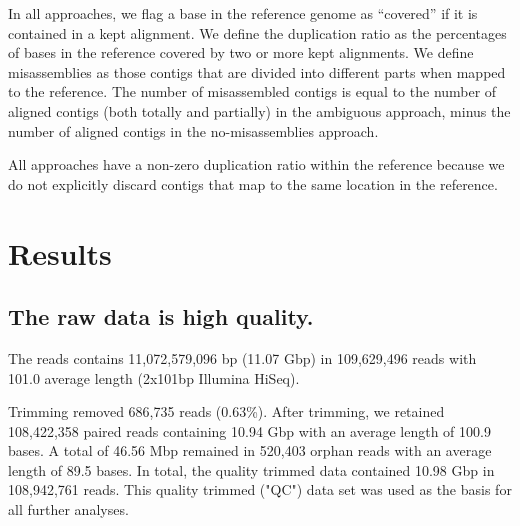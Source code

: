 \documentclass[10pt,a4paper,twocolumn]{article}
\begin{document}
In all approaches, we flag a base in the reference genome as
``covered'' if it is contained in a kept alignment.  We define the
duplication ratio as the percentages of bases in the reference covered
by two or more kept alignments. We define misassemblies as
those contigs that are divided into different parts when mapped to the
reference.  The number of misassembled contigs is equal to the number
of aligned contigs (both totally and partially) in the ambiguous
approach, minus the number of aligned contigs in the no-misassemblies
approach.


All approaches have a non-zero duplication ratio within the reference
because we do not explicitly discard contigs that map to the same
location in the reference.



\section*{Results}

\subsection*{The raw data is high quality.}

The reads contains 11,072,579,096 bp (11.07 Gbp) in 109,629,496 reads
with 101.0 average length (2x101bp Illumina HiSeq).

Trimming removed 686,735 reads (0.63\%).  After trimming, we retained
108,422,358 paired reads containing 10.94 Gbp with an average length of
100.9 bases. A total of 46.56 Mbp remained in 520,403 orphan reads with
an average length of 89.5 bases. In total, the quality trimmed data
contained 10.98 Gbp in 108,942,761 reads.  This quality trimmed ("QC")
data set was used as the basis for all further analyses.
\end{document}
